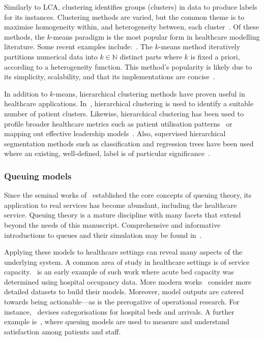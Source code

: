 \documentclass[]{interact}
\theoremstyle{plain}%
\theoremstyle{definition}
\theoremstyle{remark}
\begin{document}
Similarly to LCA, clustering identifies groups (clusters) in data to produce
labels for its instances. Clustering methods are varied, but the common theme is
to maximise homogeneity within, and heterogeneity between, each
cluster~\citep{Everitt2011}. Of these methods, the \(k\)-means paradigm is the
most popular form in healthcare modelling literature. Some recent examples
include:~\cite{%
    Elbattah2017,Haraty2015,Ogbuabor2018,Santhi2010,Silitonga2018,Vuik2016a%
}. The \(k\)-means method iteratively partitions numerical data into
\(k \in \mathbb N\) distinct parts where \(k\) is fixed a priori, according to a
heterogeneity function. This method's popularity is likely due to its
simplicity, scalability, and that its implementations are
concise~\citep{Olafsson2008,Wu2009}.

In addition to \(k\)-means, hierarchical clustering methods have proven useful
in healthcare applications. In~\cite{Vuik2016a}, hierarchical clustering is used
to identify a suitable number of patient clusters. Likewise, hierarchical
clustering has been used to profile broader healthcare metrics such as patient
utilisation patterns~\citep{Zayas2016} or mapping out effective leadership
models~\cite{Hargett2017}. Also, supervised hierarchical segmentation methods
such as classification and regression trees have been used where an existing,
well-defined, label is of particular significance~\cite{Harper2006,Kumar2019}.

\subsubsection{Queuing models}

Since the seminal works of~\cite{Erlang1917,Erlang1920} established the
core concepts of queuing theory, its application to real services has become
abundant, including the healthcare service. Queuing theory is a mature
discipline with many facets that extend beyond the needs of this manuscript.
Comprehensive and informative introductions to queues and their simulation may
be found in~\citep{Bhat2015,Shortle2018,Stewart2009}.

Applying these models to healthcare settings can reveal many aspects of the
underlying system. A common area of study in healthcare settings is of
service capacity.~\cite{McClain1976} is an early example of such work where
acute bed capacity was determined using hospital occupancy data. More
modern works~\cite{Bittencourt2018,Palvannan2012,Pinto2014} consider more
detailed datasets to build their models. Moreover, model outputs are catered
towards being actionable---as is the prerogative of operational research. For
instance,~\cite{Pinto2014} devises categorisations for hospital beds and
arrivals. A further example is~\cite{Komashie2015}, where queuing models are
used to measure and understand satisfaction among patients and staff.
\end{document}
